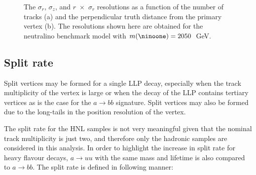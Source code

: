 \documentclass[PUB,UKenglish, texlive=2018]{\ATLASLATEXPATH atlasdoc}
\begin{document}
\begin{figure}[t]
\begin{center}
\caption{The $\sigma_{r}$, $\sigma_{z}$, and $r$~$\times$~$\sigma_{r}$ resolutions as a function of the number of tracks (a) 
and the perpendicular truth distance from the primary vertex (b).  The resolutions shown here are obtained for the neutralino benchmark model with $m(\ninoone)=2050$~GeV.}
\label{fig:resolution_param}
\end{center}
\end{figure}

\clearpage
\subsection{Split rate \label{sec:vtx_splitRate} }

Split vertices may be formed for a single LLP decay, especially when the track multiplicity of the vertex is large
or when the decay of the LLP contains tertiary vertices as is the case for the $a \rightarrow bb$ signature. Split vertices may also be formed due to the long-tails in the position resolution of the vertex.

The split rate for the HNL samples is not very meaningful given that the nominal track multiplicity is just two, and therefore only the hadronic samples are considered in this analysis.
In order to highlight the increase in split rate for heavy flavour decays, $a \rightarrow uu$ with the same mass and lifetime is also compared to $a \rightarrow bb$.
The split rate is defined in following manner:
\end{document}
